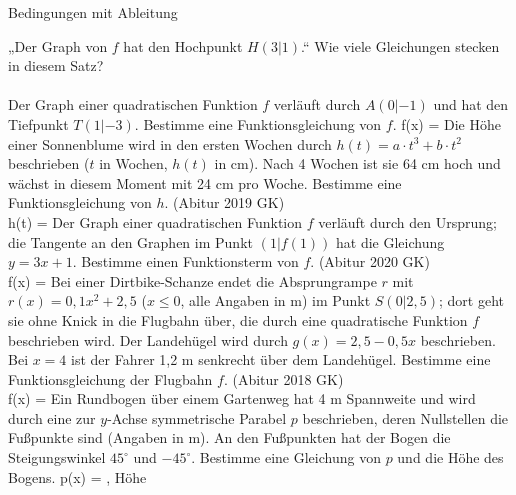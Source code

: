 \setcounter{aufgabe}{10}

\begin{aufgabe}{Bedingungen mit Ableitung}
\begin{teile}
\teil „Der Graph von $f$ hat den Hochpunkt $H(3|1)$.“ Wie viele Gleichungen stecken in diesem Satz? \\  \\ 
\teil Der Graph einer quadratischen Funktion $f$ verläuft durch $A(0|-1)$ und hat den Tiefpunkt $T(1|-3)$. Bestimme eine Funktionsgleichung von $f$. f(x) = \leerfeld
\teil Die Höhe einer Sonnenblume wird in den ersten Wochen durch $h(t) = a \cdot t^3 + b \cdot t^2$ beschrieben ($t$ in Wochen, $h(t)$ in cm). Nach 4 Wochen ist sie 64 cm hoch und wächst in diesem Moment mit 24 cm pro Woche. Bestimme eine Funktionsgleichung von $h$. \hfill (Abitur 2019 GK) \\ h(t) = \leerfeld
\teil Der Graph einer quadratischen Funktion $f$ verläuft durch den Ursprung; die Tangente an den Graphen im Punkt $(1|f(1))$ hat die Gleichung $y = 3x + 1$. Bestimme einen Funktionsterm von $f$. \hfill (Abitur 2020 GK) \\ f(x) = \leerfeld
\teil Bei einer Dirtbike-Schanze endet die Absprungrampe $r$ mit $r(x) = 0{,}1x^2 + 2{,}5$ ($x \le 0$, alle Angaben in m) im Punkt $S(0|2{,}5)$; dort geht sie ohne Knick in die Flugbahn über, die durch eine quadratische Funktion $f$ beschrieben wird. Der Landehügel wird durch $g(x) = 2{,}5 - 0{,}5x$ beschrieben. Bei $x = 4$ ist der Fahrer 1,2 m senkrecht über dem Landehügel. Bestimme eine Funktionsgleichung der Flugbahn $f$. \hfill (Abitur 2018 GK) \\ f(x) = \leerfeld
\teil Ein Rundbogen über einem Gartenweg hat 4 m Spannweite und wird durch eine zur $y$-Achse symmetrische Parabel $p$ beschrieben, deren Nullstellen die Fußpunkte sind (Angaben in m). An den Fußpunkten hat der Bogen die Steigungswinkel $45^\circ$ und $-45^\circ$. Bestimme eine Gleichung von $p$ und die Höhe des Bogens. p(x) = \leerfeld , Höhe \leerfeld

\end{teile}
\end{aufgabe}
